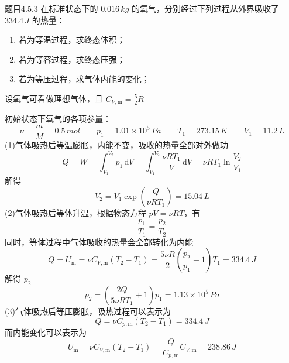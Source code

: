 \begin{question}{题目4.5.3}
    在标准状态下的 $0.016 \,\si{kg}$ 的氧气，分别经过下列过程从外界吸收了 $334.4 \,\si{J}$ 的热量：
    \begin{enumerate}
        \item[(1)] 若为等温过程，求终态体积；
        \item[(2)] 若为等容过程，求终态压强；
        \item[(3)] 若为等压过程，求气体内能的变化；
    \end{enumerate}
    设氧气可看做理想气体，且 $C_{V, \mathrm{m}} = \frac{5}{2}R$
\end{question}
\begin{solution}
    初始状态下氧气的各项参量：
    $$
        \nu = \frac{m}{M} = 0.5 \,\si{mol}
        \quad \quad
        p_1 = 1.01 \times 10^5 \,\si{Pa}
        \quad \quad
        T_1 = 273.15 \,\si{K}
        \quad \quad
        V_1 = 11.2 \,\si{L}
    $$
    (1)气体吸热后等温膨胀，内能不变，吸收的热量全部对外做功
    $$
        Q = W = \int_{V_1}^{V_2} p_1 \,\mathrm{d}V
        = \int_{V_1}^{V_2} \frac{\nu RT_1}{V} \,\mathrm{d}V
        = \nu RT_1 \ln\frac{V_2}{V_1}
    $$
    解得
    $$
        V_2 = V_1 \exp \left(\frac{Q}{\nu RT_1}\right) = 15.04 \,\si{L}
    $$
    (2)气体吸热后等体升温，根据物态方程 $pV = \nu RT$，有
    $$
        \frac{p_1}{T_1} = \frac{p_2}{T_2}
    $$
    同时，等体过程中气体吸收的热量会全部转化为内能
    $$
        Q = U_\mathrm{m} = \nu C_{V,\mathrm{m}}(T_2 - T_1)
        = \frac{5\nu R}{2} \left(\frac{p_2}{p_1} - 1\right)T_1
        = 334.4 \,\si{J}
    $$
    解得 $p_2$
    $$
        p_2 = \left(\frac{2Q}{5 \nu RT_1}+1 \right) p_1 = 1.13 \times 10^5 \,\si{Pa}
    $$
    (3)气体吸热后等压膨胀，吸热过程可以表示为
    $$
        Q = \nu C_{p,\mathrm{m}} (T_2 - T_1) = 334.4 \,\si{J}
    $$
    而内能变化可以表示为
    $$
        U_\mathrm{m} = \nu C_{V,\mathrm{m}}(T_2 - T_1)
        = \frac{Q}{C_{p,\mathrm{m}}} C_{V,\mathrm{m}}
        = 238.86 \,\si{J}
    $$
\end{solution}

